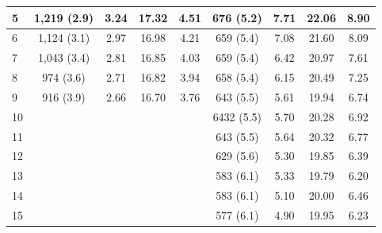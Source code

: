 \begin{table}[]
\begin{tabular}{|l|c|c|c|c|c|c|c|c|}
5                                     & 1,219 (2.9) & 3.24                & 17.32             & 4.51                  & 676 (5.2)   & 7.71                & 22.06             & 8.90                  \\ \hline
6                                     & 1,124 (3.1) & 2.97                & 16.98             & 4.21                  & 659 (5.4)   & 7.08                & 21.60             & 8.09                  \\ \hline
7                                     & 1,043 (3.4) & 2.81                & 16.85             & 4.03                  & 659 (5.4)   & 6.42                & 20.97             & 7.61                  \\ \hline
8                                     & 974 (3.6)   & 2.71                & 16.82             & 3.94                  & 658 (5.4)   & 6.15                & 20.49             & 7.25                  \\ \hline
9                                     & 916 (3.9)   & 2.66                & 16.70             & 3.76                  & 643 (5.5)   & 5.61                & 19.94             & 6.74                  \\ \hline
10                                    &                     &                     &                   &                       & 6432 (5.5)   & 5.70                & 20.28             & 6.92                  \\ \hline
11                                    &                     &                     &                   &                       & 643 (5.5)   & 5.64                & 20.32             & 6.77                  \\ \hline
12                                    &                     &                     &                   &                       & 629 (5.6)   & 5.30                & 19.85             & 6.39                  \\ \hline
13                                    &                     &                     &                   &                       & 583 (6.1)   & 5.33                & 19.79             & 6.20                  \\ \hline
14                                    &                     &                     &                   &                       & 583 (6.1)   & 5.10                & 20.00             & 6.46                  \\ \hline
15                                    &                     &                     &                   &                       & 577 (6.1)   & 4.90                & 19.95             & 6.23                  \\ \hline

\end{tabular}
\end{table}
